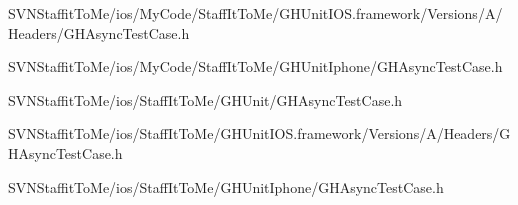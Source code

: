 \begin{DoxyCompactItemize}
\-S\-V\-N\-Staffit\-To\-Me/ios/\-My\-Code/\-Staff\-It\-To\-Me/\-G\-H\-Unit\-I\-O\-S.\-framework/\-Versions/\-A/\-Headers/\-G\-H\-Async\-Test\-Case.\-h\item 
\-S\-V\-N\-Staffit\-To\-Me/ios/\-My\-Code/\-Staff\-It\-To\-Me/\-G\-H\-Unit\-Iphone/\-G\-H\-Async\-Test\-Case.\-h\item 
\-S\-V\-N\-Staffit\-To\-Me/ios/\-Staff\-It\-To\-Me/\-G\-H\-Unit/\-G\-H\-Async\-Test\-Case.\-h\item 
\-S\-V\-N\-Staffit\-To\-Me/ios/\-Staff\-It\-To\-Me/\-G\-H\-Unit\-I\-O\-S.\-framework/\-Versions/\-A/\-Headers/\-G\-H\-Async\-Test\-Case.\-h\item 
\-S\-V\-N\-Staffit\-To\-Me/ios/\-Staff\-It\-To\-Me/\-G\-H\-Unit\-Iphone/\-G\-H\-Async\-Test\-Case.\-h\end{DoxyCompactItemize}
